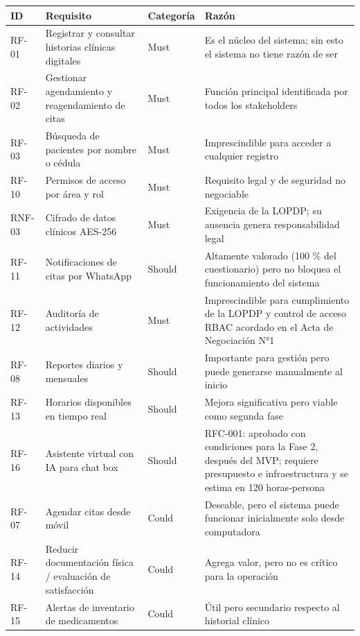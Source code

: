 \documentclass[11pt,a4paper]{article}
\begin{document}
	\begin{longtable}{p{} p{} p{} p{}}
		
		\toprule
		\textbf{ID} &
		\textbf{Requisito} &
		\textbf{Categoría} &
		\textbf{Razón} \\
		\midrule
		\endhead
		
		\bottomrule
		\endlastfoot
		RF-01 & Registrar y consultar historias clínicas digitales & Must & Es el núcleo del sistema; sin esto el sistema no tiene razón de ser \\
		RF-02 & Gestionar agendamiento y reagendamiento de citas & Must & Función principal identificada por todos los stakeholders \\
		RF-03 & Búsqueda de pacientes por nombre o cédula & Must & Imprescindible para acceder a cualquier registro \\
		RF-10 & Permisos de acceso por área y rol & Must & Requisito legal y de seguridad no negociable \\
		RNF-03 & Cifrado de datos clínicos AES-256 & Must & Exigencia de la LOPDP; su ausencia genera responsabilidad legal \\
		RF-11 & Notificaciones de citas por WhatsApp & Should & Altamente valorado (100 \% del cuestionario) pero no bloquea el funcionamiento del sistema \\
		RF-12 & Auditoría de actividades & Must & Imprescindible para cumplimiento de la LOPDP y control de acceso RBAC acordado en el Acta de Negociación N°1 \\
		RF-08 & Reportes diarios y mensuales & Should & Importante para gestión pero puede generarse manualmente al inicio \\
		RF-13 & Horarios disponibles en tiempo real & Should & Mejora significativa pero viable como segunda fase \\
		RF-16 & Asistente virtual con IA para chat box & Should & RFC-001: aprobado con condiciones para la Fase 2, después del MVP; requiere presupuesto e infraestructura y se estima en 120 horas-persona \\
		RF-07 & Agendar citas desde móvil & Could & Deseable, pero el sistema puede funcionar inicialmente solo desde computadora \\
		RF-14 & Reducir documentación física / evaluación de satisfacción & Could & Agrega valor, pero no es crítico para la operación \\
		RF-15 & Alertas de inventario de medicamentos & Could & Útil pero secundario respecto al historial clínico \\

\end{longtable}
\end{document}
